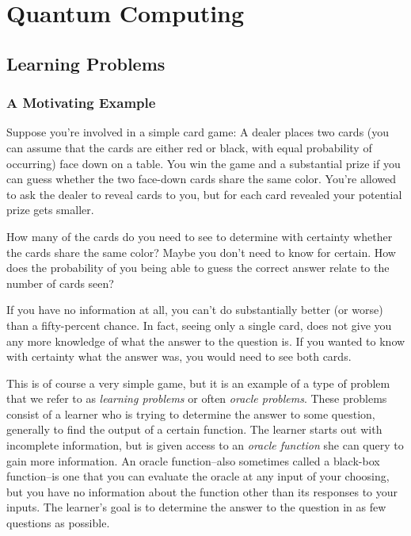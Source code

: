 \chapter{Quantum Computing}

\section{Learning Problems}

\subsection{A Motivating Example}


Suppose you're involved in a simple card game: A dealer places two cards (you can assume that the cards are
            either red or black, with equal probability of occurring)  face down on a table. You win the game and a
        substantial prize if you can guess whether the two face-down cards share the same color. You're allowed to
        ask the dealer to reveal cards to you, but for each card revealed your potential prize gets smaller.

        How many of the cards do you need to see to determine with certainty whether the cards share the same
        color?  Maybe you don't need to know for certain. How does the probability of you being able to guess the
        correct answer relate to the number of cards seen?


        If you have no information at all, you can't do substantially better (or worse) than a fifty-percent
        chance. In fact, seeing only a single card, does not give you any more knowledge of what the answer to the
        question is. If you wanted to know with certainty what the answer was, you would need to see both cards.


        This is of course a very simple game, but it is an example of a type of problem that we refer to as
        \emph{learning problems} or often \emph{oracle problems}. These problems consist of a learner who is trying
        to determine the answer to some question, generally to find the output of a certain function. The learner
        starts out with incomplete information, but is given access to an \emph{oracle function} she can query to
        gain more information. An oracle function--also sometimes called a black-box function--is one that you can
        evaluate the oracle at any input of your choosing, but you have no information about the function other
        than its responses to your inputs. The learner's goal is to determine the answer to the question in as few
        questions as possible. 

